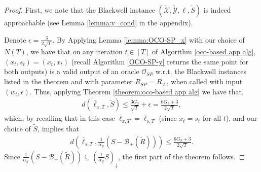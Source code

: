 \documentclass[a4paper,12pt]{article}
\newcommand{\mY}{\mathcal{Y}}
\newcommand{\mX}{\mathcal{X}}
\newcommand{\tY}{\tilde{\mathcal{Y}}}
\newcommand{\tX}{\tilde{\mathcal{X}}}
\newcommand{\tS}{\tilde{S}}
\newcommand{\mB}{\mathcal{B}}
\newcommand{\oraclesp}{\mathcal{O}_{SP}}
\begin{document}
\begin{proof}

First, we note that the Blackwell instance $(\tX, \tY, \ell, \tS)$ is indeed approachable (see Lemma \ref{lemma:y_cond} in the appendix).

Denote $\epsilon =\frac{3}{2\sqrt{T}}$. By Applying Lemma \ref{lemma:OCO-SP_x} with our choice of $N(T)$, we have that on any iteration $t\in[T]$ of Algorithm \ref{oco-based app  alg}, $(x_t, s_t) = (x_t,x_t)$ (recall Algorithm \ref{OCO-SP-y} returns the same point for both outputs) is a valid output of an oracle $\oraclesp$ w.r.t. the Blackwell instances listed in the theorem and with parameter $R_{SP} = R_{\mX}$, when called with input $(w_t, \epsilon)$. Thus, applying Theorem \ref{theorem:oco-based app  alg} we have that,
\begin{align*}%
d\left(\bar{\ell}_{x,T} , \tilde{S}\right) \leq \frac{3G_3}{\sqrt{T}} + \epsilon = \frac{6G_3+3}{2\sqrt{T}},
\end{align*} 
which, by recalling that in this case $\bar{\ell}_{x,T} = \bar{\ell}_{s,T}$ (since $x_t=s_t$ for all $t$), and our choice of $\tilde{S}$,  implies that 
\begin{align*}%
d\left(\bar{\ell}_{s,T} , \frac{1}{\alpha_{\mY}}\left({S-\mB_+(\tilde{R})}\right)\right) \leq  \frac{6G_3+3}{2\sqrt{T}}.
\end{align*} 
Since $\frac{1}{\alpha_{\mY}}\left({S-\mB_+(\tilde{R})}\right) \subseteq \left({\frac{1}{\alpha_{\mY}}S}\right)_{\downarrow}$, the first part of the theorem follows.


\end{proof}
\end{document}
